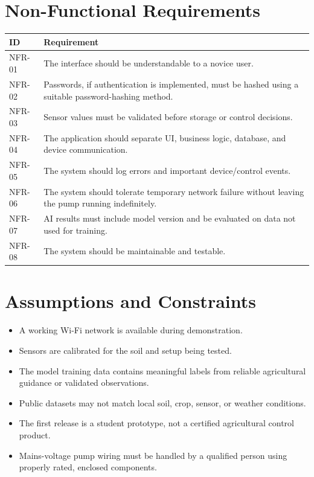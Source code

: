 \documentclass[12pt,a4paper]{report}
\begin{document}
\section{Non-Functional Requirements}
\begin{longtable}{p{}p{}}
\toprule
\textbf{ID} & \textbf{Requirement}\\
\midrule
NFR-01 & The interface should be understandable to a novice user.\\
NFR-02 & Passwords, if authentication is implemented, must be hashed using a suitable password-hashing method.\\
NFR-03 & Sensor values must be validated before storage or control decisions.\\
NFR-04 & The application should separate UI, business logic, database, and device communication.\\
NFR-05 & The system should log errors and important device/control events.\\
NFR-06 & The system should tolerate temporary network failure without leaving the pump running indefinitely.\\
NFR-07 & AI results must include model version and be evaluated on data not used for training.\\
NFR-08 & The system should be maintainable and testable.\\
\bottomrule
\end{longtable}

\section{Assumptions and Constraints}
\begin{itemize}[leftmargin=*]
\item A working Wi-Fi network is available during demonstration.
\item Sensors are calibrated for the soil and setup being tested.
\item The model training data contains meaningful labels from reliable agricultural guidance or validated observations.
\item Public datasets may not match local soil, crop, sensor, or weather conditions.
\item The first release is a student prototype, not a certified agricultural control product.
\item Mains-voltage pump wiring must be handled by a qualified person using properly rated, enclosed components.
\end{itemize}
\end{document}

